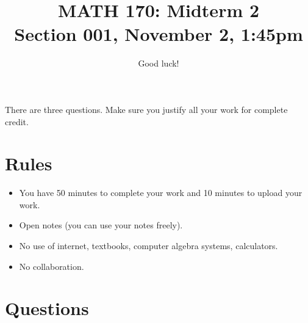 \documentclass[12pt]{amsart}
\title{ MATH 170: Midterm 2 \\
\tiny{Section 001, November 2, 1:45pm}}
\author{Good luck!}
\date{}
\begin{document}
\maketitle

There are three questions. Make sure you justify all your work for complete credit.

\section*{Rules}

\begin{itemize}[leftmargin=*]
    \item You have 50 minutes to complete your work and 10 minutes to upload your work.
    \item Open notes (you can use your notes freely).
    \item No use of internet, textbooks, computer algebra systems, calculators. 
    \item No collaboration.
\end{itemize}

\section*{Questions}
\end{document}
